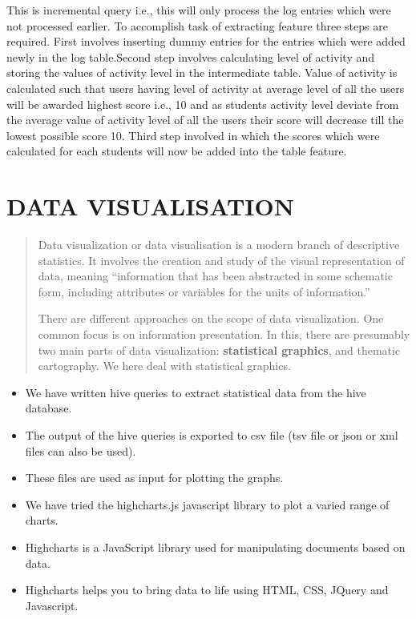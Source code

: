 \documentclass[a4paper,12pt,oneside]{sphinxmanual}
\begin{document}
This is incremental query i.e., this will only process the log entries which were not processed earlier. To accomplish task of extracting feature three steps are required. First involves  inserting dummy entries for the entries which were added newly in the log table.Second step involves calculating level of activity and storing the values of activity level in the intermediate table. Value of activity is calculated such that users having level of activity at average level of all the users will be awarded highest score i.e., 10 and as students activity level deviate from the average value of activity level of all the users their score will decrease till the lowest possible score 10. Third step involved in which the scores which were calculated for each students will now be added into the table feature.


\chapter{DATA VISUALISATION}
\label{document:data-visualisation}\begin{quote}

Data visualization or data visualisation is a modern branch of descriptive statistics. It involves the creation and study of the visual representation of data, meaning ``information that has been abstracted in some schematic form, including attributes or variables for the units of information.''

There are different approaches on the scope of data visualization. One common focus is on information presentation. In this, there are presumably two main parts of data visualization: \textbf{statistical graphics}, and thematic cartography. We here deal with statistical graphics.
\end{quote}
\begin{itemize}
\item {} 
We have written hive queries to extract statistical data from the hive database.

\item {} 
The output of the hive queries is exported to csv file (tsv file or json or xml files can also be used).

\item {} 
These files are used as input for plotting the graphs.

\item {} 
We have tried the highcharts.js javascript library to plot a varied range of charts.

\item {} 
Highcharts is a JavaScript library used for manipulating documents based on data.

\item {} 
Highcharts helps you to bring data to life using HTML, CSS, JQuery and Javascript.

\end{itemize}
\end{document}
